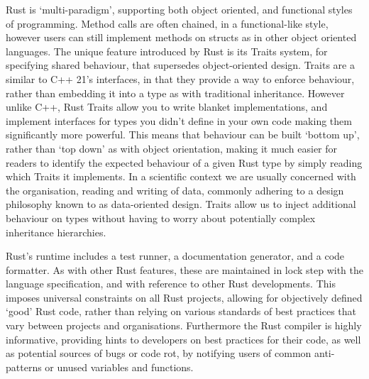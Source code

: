 Rust is `multi-paradigm', supporting both object oriented, and functional styles of programming. Method calls are often chained, in a functional-like style, however users can still implement methods on structs as in other object oriented languages. The unique feature introduced by Rust is its Traits system, for specifying shared behaviour, that supersedes object-oriented design. Traits are a similar to C++ 21's interfaces, in that they provide a way to enforce behaviour, rather than embedding it into a type as with traditional inheritance. However unlike C++, Rust Traits allow you to write blanket implementations, and implement interfaces for types you didn't define in your own code making them significantly more powerful. This means that behaviour can be built `bottom up', rather than `top down' as with object orientation, making it much easier for readers to identify the expected behaviour of a given Rust type by simply reading which Traits it implements. In a scientific context we are usually concerned with the organisation, reading and writing of data, commonly adhering to a design philosophy known to as data-oriented design. Traits allow us to inject additional behaviour on types without having to worry about potentially complex inheritance hierarchies.

Rust's runtime includes a test runner, a documentation generator, and a code formatter. As with other Rust features, these are maintained in lock step with the language specification, and with reference to other Rust developments. This imposes universal constraints on all Rust projects, allowing for objectively defined `good' Rust code, rather than relying on various standards of best practices that vary between projects and organisations. Furthermore the Rust compiler is highly informative, providing hints to developers on best practices for their code, as well as potential sources of bugs or code rot, by notifying users of common anti-patterns or unused variables and functions.

